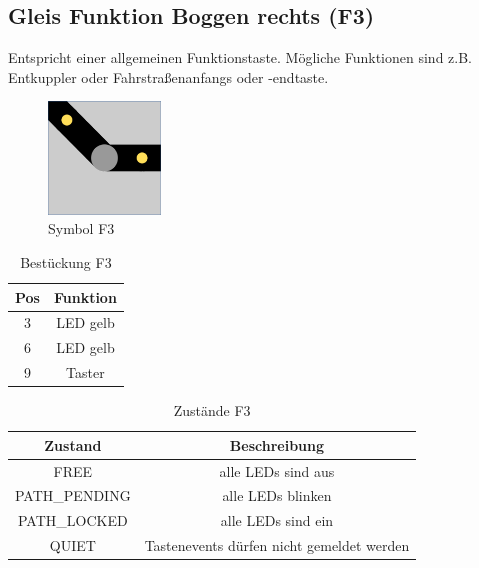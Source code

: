 \documentclass[10pt,a4paper]{article}
\begin{document}
\subsection{Gleis Funktion Boggen rechts (F3)}
Entspricht einer allgemeinen Funktionstaste. Mögliche Funktionen sind z.B. Entkuppler oder Fahrstraßenanfangs oder -endtaste.
\begin{figure}[hbtp]
\centering
\includegraphics[width=3cm]{../folien/f3.png}
\caption{Symbol F3}
\end{figure}
\begin{table}[h!]
\centering
\begin{tabular}{c|c}
\textbf{Pos} & \textbf{Funktion} \\ \hline
3 & LED gelb \\
6 & LED gelb \\
9 & Taster
\end{tabular}
\caption{Bestückung F3}
\end{table}
\begin{table}[h!]
\centering
\begin{tabular}{c|c}
\textbf{Zustand} & \textbf{Beschreibung} \\ \hline
FREE & alle LEDs sind aus \\
PATH\_PENDING & alle LEDs blinken \\
PATH\_LOCKED & alle LEDs sind ein \\
QUIET & Tastenevents dürfen nicht gemeldet werden
\end{tabular}
\caption{Zustände F3}
\end{table}
 
 \newpage
\end{document}
